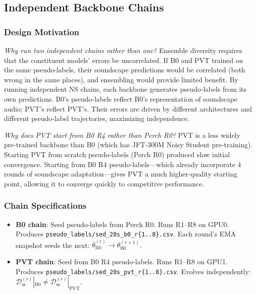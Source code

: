 \documentclass[journal]{IEEEtran}
\begin{document}
\subsection{Independent Backbone Chains}

\subsubsection{Design Motivation}

\emph{Why run two independent chains rather than one?}
Ensemble diversity requires that the constituent models' errors be uncorrelated.
If B0 and PVT trained on the same pseudo-labels, their soundscape predictions would be correlated (both wrong in the same places), and ensembling would provide limited benefit.
By running independent NS chains, each backbone generates pseudo-labels from its own predictions.
B0's pseudo-labels reflect B0's representation of soundscape audio; PVT's reflect PVT's.
Their errors are driven by different architectures and different pseudo-label trajectories, maximizing independence.

\emph{Why does PVT start from B0 R4 rather than Perch R0?}
PVT is a less widely pre-trained backbone than B0 (which has JFT-300M Noisy Student pre-training).
Starting PVT from scratch pseudo-labels (Perch R0) produced slow initial convergence.
Starting from B0 R4 pseudo-labels---which already incorporate 4 rounds of soundscape adaptation---gives PVT a much higher-quality starting point, allowing it to converge quickly to competitive performance.

\subsubsection{Chain Specifications}

\begin{itemize}
  \item \textbf{B0 chain}: Seed pseudo-labels from Perch R0. Runs R1--R8 on GPU0. Produces \texttt{pseudo\_labels/sed\_20s\_b0\_r\{1..8\}.csv}. Each round's EMA snapshot seeds the next: $\bar{\theta}^{(r)}_\text{B0} \to \theta^{(r+1)}_\text{B0}$.
  \item \textbf{PVT chain}: Seed from B0 R4 pseudo-labels. Runs R1--R8 on GPU1. Produces \texttt{pseudo\_labels/sed\_20s\_pvt\_r\{1..8\}.csv}. Evolves independently: $\mathcal{D}_\text{ss}^{(r)}|_\text{B0} \neq \mathcal{D}_\text{ss}^{(r)}|_\text{PVT}$.
\end{itemize}

\end{document}
